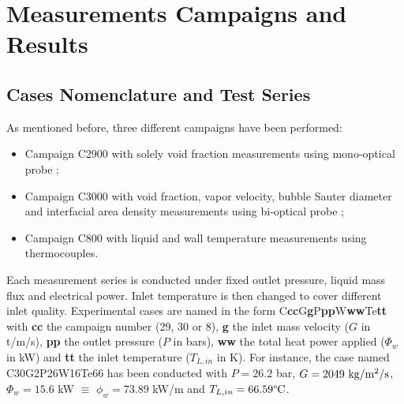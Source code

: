\section{Measurements Campaigns and Results}
\label{sec:deb_exp_campaign}


\subsection{Cases Nomenclature and Test Series}

As mentioned before, three different campaigns have been performed:

\begin{itemize}
\item Campaign C2900 with solely void fraction measurements using mono-optical probe ;

\item Campaign C3000 with void fraction, vapor velocity, bubble Sauter diameter and interfacial area density measurements using bi-optical probe ;

\item Campaign C800 with liquid and wall temperature measurements using thermocouples.
\end{itemize}


Each measurement series is conducted under fixed outlet pressure, liquid mass flux and electrical power. Inlet temperature is then changed to cover different inlet quality. Experimental cases are named in the form C\textbf{cc}G\textbf{g}P\textbf{pp}W\textbf{ww}Te\textbf{tt} with \textbf{cc} the campaign number (29, 30 or 8), \textbf{g} the inlet mass velocity ($G$ in t/m/s), \textbf{pp} the outlet pressure ($P$ in bars), \textbf{ww} the total heat power applied ($\Phi_{w}$ in kW) and \textbf{tt} the inlet temperature ($T_{L,in}$ in K). For instance, the case named C30G2P26W16Te66 has been conducted with $P=26.2$ bar, $G=2049\ \text{kg/m$^{2}$/s}$, $\Phi_{w}=15.6$ kW $\equiv$ $\phi_{w} =73.89$ kW/m and $T_{L,in} = 66.59 \degree\mathrm{C}$.


